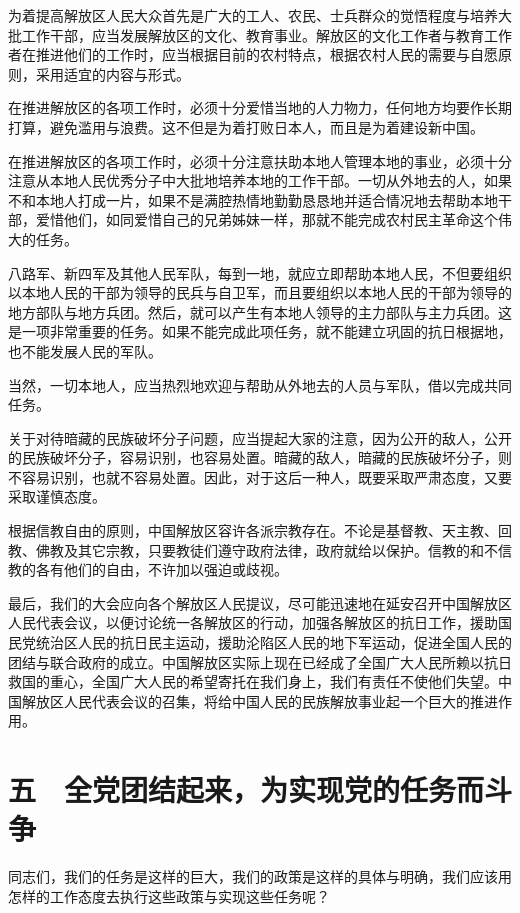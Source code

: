 为着提高解放区人民大众首先是广大的工人、农民、士兵群众的觉悟程度与培养大批工作干部，应当发展解放区的文化、教育事业。解放区的文化工作者与教育工作者在推进他们的工作时，应当根据目前的农村特点，根据农村人民的需要与自愿原则，采用适宜的内容与形式。

在推进解放区的各项工作时，必须十分爱惜当地的人力物力，任何地方均要作长期打算，避免滥用与浪费。这不但是为着打败日本人，而且是为着建设新中国。

在推进解放区的各项工作时，必须十分注意扶助本地人管理本地的事业，必须十分注意从本地人民优秀分子中大批地培养本地的工作干部。一切从外地去的人，如果不和本地人打成一片，如果不是满腔热情地勤勤恳恳地并适合情况地去帮助本地干部，爱惜他们，如同爱惜自己的兄弟姊妹一样，那就不能完成农村民主革命这个伟大的任务。

八路军、新四军及其他人民军队，每到一地，就应立即帮助本地人民，不但要组织以本地人民的干部为领导的民兵与自卫军，而且要组织以本地人民的干部为领导的地方部队与地方兵团。然后，就可以产生有本地人领导的主力部队与主力兵团。这是一项非常重要的任务。如果不能完成此项任务，就不能建立巩固的抗日根据地，也不能发展人民的军队。

当然，一切本地人，应当热烈地欢迎与帮助从外地去的人员与军队，借以完成共同任务。

关于对待暗藏的民族破坏分子问题，应当提起大家的注意，因为公开的敌人，公开的民族破坏分子，容易识别，也容易处置。暗藏的敌人，暗藏的民族破坏分子，则不容易识别，也就不容易处置。因此，对于这后一种人，既要采取严肃态度，又要采取谨慎态度。

根据信教自由的原则，中国解放区容许各派宗教存在。不论是基督教、天主教、回教、佛教及其它宗教，只要教徒们遵守政府法律，政府就给以保护。信教的和不信教的各有他们的自由，不许加以强迫或歧视。

最后，我们的大会应向各个解放区人民提议，尽可能迅速地在延安召开中国解放区人民代表会议，以便讨论统一各解放区的行动，加强各解放区的抗日工作，援助国民党统治区人民的抗日民主运动，援助沦陷区人民的地下军运动，促进全国人民的团结与联合政府的成立。中国解放区实际上现在已经成了全国广大人民所赖以抗日救国的重心，全国广大人民的希望寄托在我们身上，我们有责任不使他们失望。中国解放区人民代表会议的召集，将给中国人民的民族解放事业起一个巨大的推进作用。

\section{五　全党团结起来，为实现党的任务而斗争}

同志们，我们的任务是这样的巨大，我们的政策是这样的具体与明确，我们应该用怎样的工作态度去执行这些政策与实现这些任务呢？

